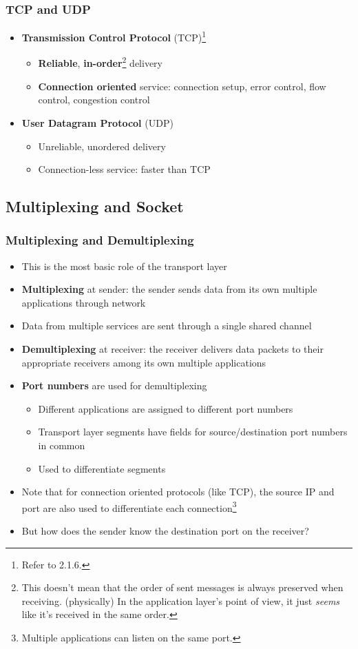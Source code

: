 \subsubsection{TCP and UDP}
\begin{itemize}
	\item \textbf{Transmission Control Protocol} (TCP)\footnote{Refer to 2.1.6.}
	\begin{itemize}
		\item \textbf{Reliable}, \textbf{in-order}\footnote{This doesn't mean that the order of sent messages is always preserved when receiving. (physically) In the application layer's point of view, it just \textit{seems} like it's received in the same order.} delivery
		\item \textbf{Connection oriented} service: connection setup, error control, flow control, congestion control
	\end{itemize}
	\item \textbf{User Datagram Protocol} (UDP)
	\begin{itemize}
		\item Unreliable, unordered delivery
		\item Connection-less service: faster than TCP
	\end{itemize}
\end{itemize}

\subsection{Multiplexing and Socket}
\subsubsection{Multiplexing and Demultiplexing}
\begin{itemize}
	\item This is the most basic role of the transport layer
	\item \textbf{Multiplexing} at sender: the sender sends data from its own multiple applications through network
	\item Data from multiple services are sent through a single shared channel
	\item \textbf{Demultiplexing} at receiver: the receiver delivers data packets to their appropriate receivers among its own multiple applications
	\item \textbf{Port numbers} are used for demultiplexing
	\begin{itemize}
		\item Different applications are assigned to different port numbers
		\item Transport layer segments have fields for source/destination port numbers in common
		\item Used to differentiate segments
	\end{itemize}
	\item Note that for connection oriented protocols (like TCP), the source IP and port are also used to differentiate each connection\footnote{Multiple applications can listen on the same port.}
	\item But how does the sender know the destination port on the receiver?
\end{itemize}

